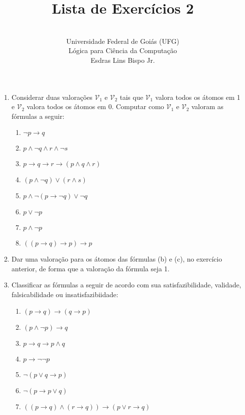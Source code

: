 \documentclass[12pt,a4paper,oneside]{article}
\author{\\Universidade Federal de Goiás (UFG) \\Lógica para Ciência da Computação \\Esdras Lins Bispo Jr.}
\title{\sc \huge Lista de Exercícios 2}
\begin{document}
\maketitle

\begin{enumerate}

	\item Considerar duas valorações $\mathcal{V}_1$ e $\mathcal{V}_2$ tais que $\mathcal{V}_1$ valora todos os átomos em 1 e $\mathcal{V}_2$ valora todos os átomos em 0. Computar como $\mathcal{V}_1$ e $\mathcal{V}_2$ valoram as fórmulas a seguir:

		\begin{enumerate}
			\item $\neg p \rightarrow q$
			\item $p \wedge \neg q \wedge r \wedge \neg s$
			\item $p \rightarrow q \rightarrow r \rightarrow (p \wedge q \wedge r)$
			\item $(p \wedge \neg q) \vee (r \wedge s)$
			\item $p \wedge \neg (p \rightarrow \neg q) \vee \neg q$
			\item $p \vee \neg p$
			\item $p \wedge \neg p$
			\item $((p \rightarrow q) \rightarrow p) \rightarrow p$
		\end{enumerate}
	
	\item Dar uma valoração para os átomos das fórmulas (b) e (c), no exercício anterior, de forma que a valoração da fórmula seja 1.
		
	\item Classificar as fórmulas a seguir de acordo com sua satisfazibilidade, validade, falsicabilidade ou insatisfazibiidade:
	
		\begin{enumerate}
			\item $(p \rightarrow q) \rightarrow (q \rightarrow p)$
			\item $(p \wedge \neg p) \rightarrow q$
			\item $p \rightarrow q \rightarrow p \wedge q$
			\item $p \rightarrow \neg \neg p$
			\item $\neg(p \vee q \rightarrow p)$
			\item $\neg(p \rightarrow p \vee q)$
			\item $((p \rightarrow q) \wedge (r \rightarrow q)) \rightarrow (p \vee r \rightarrow q)$
		\end{enumerate}
	

\end{enumerate}
\end{document}
